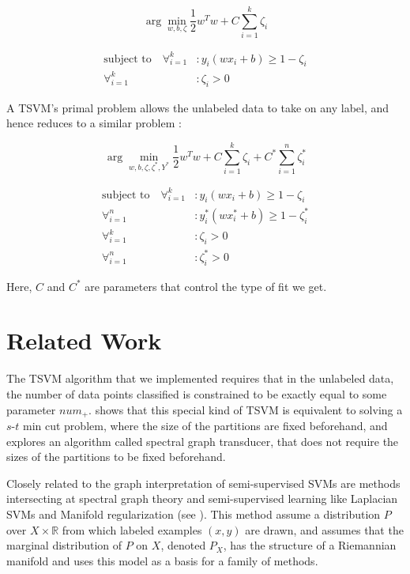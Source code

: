 \documentclass[11pt]{article}
\begin{document}
\begin{equation}\label{eq:1}
\arg\min_{w, b, \zeta} \frac{1}{2}w^Tw+C\sum_{i=1}^k\zeta_i
\end{equation}

\begin{align*}
\textrm{subject to}\quad \forall_{i=1}^k&: y_i(wx_i+b)\geq 1-\zeta_i \\
\forall_{i=1}^k&: \zeta_i>0
\end{align*}

A TSVM's primal problem allows the unlabeled data to take on any label, and hence reduces to a similar problem \cite{Joachims:1999}:

\begin{equation}\label{eq:2}
\arg\min_{w, b, \zeta, \zeta^*, Y^*} \frac{1}{2}w^Tw+C\sum_{i=1}^k\zeta_i+C^*\sum_{i=1}^n\zeta^*_i
\end{equation}

\begin{align*}
\textrm{subject to}\quad \forall_{i=1}^k&: y_i(wx_i+b)\geq 1-\zeta_i \\
\forall_{i=1}^n&: y^*_i(wx^*_i+b)\geq 1-\zeta^*_i \\
\forall_{i=1}^k&: \zeta_i>0 \\
\forall_{i=1}^n&: \zeta^*_i>0
\end{align*}

Here, $C$ and $C^*$ are parameters that control the type of fit we get.

\section{Related Work}

The TSVM algorithm that we implemented requires that in the unlabeled
data, the number of data points classified is constrained to be
exactly equal to some parameter $num_+$. \cite{joachims2003transductive}
shows that this special kind of TSVM is equivalent to solving
a $s$-$t$ min cut problem, where the size of the partitions are fixed beforehand, and explores an algorithm called spectral graph transducer,
that does not require the sizes of the partitions to be fixed beforehand.

Closely related to the graph interpretation of semi-supervised SVMs
are methods intersecting at spectral graph theory and semi-supervised
learning like Laplacian SVMs and Manifold regularization
(see \cite{belkin2005manifold}). This method assume a distribution $P$
over $X\times \mathbb{R}$ from which labeled examples $(x,y)$ are drawn,
and assumes that the marginal distribution of $P$ on $X$, denoted $P_X$,
has the structure of a Riemannian manifold and uses this model
as a basis for a family of methods.
\end{document}

